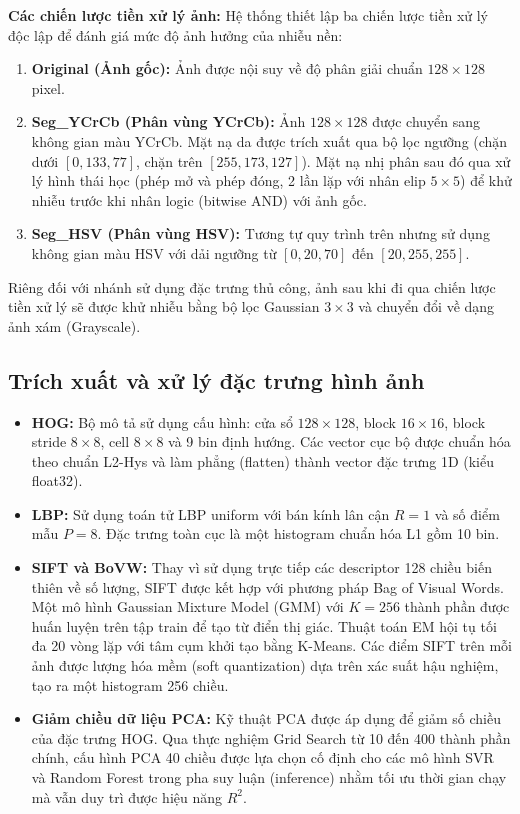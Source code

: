\textbf{Các chiến lược tiền xử lý ảnh:}
Hệ thống thiết lập ba chiến lược tiền xử lý độc lập để đánh giá mức độ ảnh hưởng của nhiễu nền:
\begin{enumerate}
    \item \textbf{Original (Ảnh gốc):} Ảnh được nội suy về độ phân giải chuẩn $128 \times 128$ pixel.
    \item \textbf{Seg\_YCrCb (Phân vùng YCrCb):} Ảnh $128 \times 128$ được chuyển sang không gian màu YCrCb. Mặt nạ da được trích xuất qua bộ lọc ngưỡng (chặn dưới $[0, 133, 77]$, chặn trên $[255, 173, 127]$). Mặt nạ nhị phân sau đó qua xử lý hình thái học (phép mở và phép đóng, 2 lần lặp với nhân elip $5 \times 5$) để khử nhiễu trước khi nhân logic (bitwise AND) với ảnh gốc.
    \item \textbf{Seg\_HSV (Phân vùng HSV):} Tương tự quy trình trên nhưng sử dụng không gian màu HSV với dải ngưỡng từ $[0, 20, 70]$ đến $[20, 255, 255]$.
\end{enumerate}
Riêng đối với nhánh sử dụng đặc trưng thủ công, ảnh sau khi đi qua chiến lược tiền xử lý sẽ được khử nhiễu bằng bộ lọc Gaussian $3 \times 3$ và chuyển đổi về dạng ảnh xám (Grayscale).

\subsection{Trích xuất và xử lý đặc trưng hình ảnh}
\begin{itemize}
    \item \textbf{HOG:} Bộ mô tả sử dụng cấu hình: cửa sổ $128 \times 128$, block $16 \times 16$, block stride $8 \times 8$, cell $8 \times 8$ và 9 bin định hướng. Các vector cục bộ được chuẩn hóa theo chuẩn L2-Hys và làm phẳng (flatten) thành vector đặc trưng 1D (kiểu float32).
    \item \textbf{LBP:} Sử dụng toán tử LBP uniform với bán kính lân cận $R=1$ và số điểm mẫu $P=8$. Đặc trưng toàn cục là một histogram chuẩn hóa L1 gồm 10 bin.
    \item \textbf{SIFT và BoVW:} Thay vì sử dụng trực tiếp các descriptor 128 chiều biến thiên về số lượng, SIFT được kết hợp với phương pháp Bag of Visual Words. Một mô hình Gaussian Mixture Model (GMM) với $K=256$ thành phần được huấn luyện trên tập train để tạo từ điển thị giác. Thuật toán EM hội tụ tối đa 20 vòng lặp với tâm cụm khởi tạo bằng K-Means. Các điểm SIFT trên mỗi ảnh được lượng hóa mềm (soft quantization) dựa trên xác suất hậu nghiệm, tạo ra một histogram 256 chiều.
    \item \textbf{Giảm chiều dữ liệu PCA:} Kỹ thuật PCA được áp dụng để giảm số chiều của đặc trưng HOG. Qua thực nghiệm Grid Search từ 10 đến 400 thành phần chính, cấu hình PCA 40 chiều được lựa chọn cố định cho các mô hình SVR và Random Forest trong pha suy luận (inference) nhằm tối ưu thời gian chạy mà vẫn duy trì được hiệu năng $R^2$.
\end{itemize}

